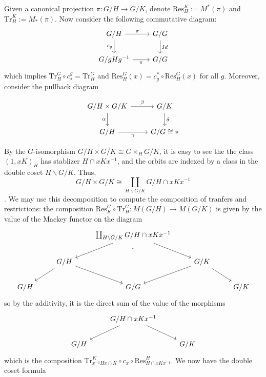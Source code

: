 \documentclass{article}
\theoremstyle{definition}
\theoremstyle{definition}
\theoremstyle{definition}
\theoremstyle{definition}
\theoremstyle{definition}
\theoremstyle{definition}
\theoremstyle{definition}
\begin{document}
Given a canonical projection $\pi: G/H\to G/K$, denote $\textrm{Res}_H^K:= M^*(\pi)$ and  $\textrm{Tr}_H^K:= M_*(\pi)$. 
 Now consider the following commutative diagram:
\[\begin{tikzcd}
	{G/H} & {G/G} \\
	{G/gHg^{-1}} & {G/G}
	\arrow["\pi", from=1-1, to=1-2]
	\arrow["{c_g}"', from=1-1, to=2-1]
	\arrow["Id", from=1-2, to=2-2]
	\arrow["\pi"', from=2-1, to=2-2]
\end{tikzcd}\]
which implies $\textrm{Tr}_H^G\circ c_*^g=\textrm{Tr}_H^G$ and $\textrm{Res}_H^G(x)=c_g^*\circ\textrm{Res}_H^G(x)$ for all $g$. Moreover, consider the pullback diagram


\[\begin{tikzcd}
	G/H\times G/K & G/K \\
	G/H & G/G\cong *
	\arrow["\beta", from=1-1, to=1-2]
	\arrow["\alpha"', from=1-1, to=2-1]
	\arrow["\delta", from=1-2, to=2-2]
	\arrow["\gamma"', from=2-1, to=2-2]
\end{tikzcd}\]

By the $G$-isomorphism $G/H\times G/K\cong G\times_H G/K$, it is easy to see the the class $(1,xK)_H$ has stablizer $H\cap xKx^{-1}$, and the orbits are indexed by a class in the double coset $H\backslash G/K$. Thus, $$G/H\times G/K\cong \coprod_{H\backslash G/K}G/H\cap xKx^{-1}$$. 
We may use this decomposition to compute the composition of tranfers and restrictions: the composition $\textrm{Res}_K^G\circ \textrm{Tr}_H^G: M(G/H)\to M(G/K)$ is given by the value of the Mackey functor on the diagram 
\[\begin{tikzcd}
	&& {\coprod_{H\backslash G/K} G/H\cap xKx^{-1}} \\
	& {G/H} && {G/K} \\
	{G/H} && {G/G} && {G/K}
	\arrow[from=1-3, to=2-2]
	\arrow[from=1-3, to=2-4]
	\arrow["\lrcorner"{anchor=center, pos=0.125, rotate=-45}, draw=none, from=1-3, to=3-3]
	\arrow[from=2-2, to=3-1]
	\arrow[from=2-2, to=3-3]
	\arrow[from=2-4, to=3-3]
	\arrow[from=2-4, to=3-5]
\end{tikzcd}\]
so by the additivity, it is the direct sum of the value of the morphisms
\[\begin{tikzcd}
	& {G/H\cap xKx^{-1}} \\
	{G/H} && {G/K}
	\arrow[from=1-2, to=2-1]
	\arrow[from=1-2, to=2-3]
\end{tikzcd}\]
which is the composition $\textrm{Tr}_{x^{-1}Hx\cap K}^{K}\circ c_{x}\circ \textrm{Res}_{H\cap xKx^{-1}}^{H}$. We now have the double coset formula
\end{document}
